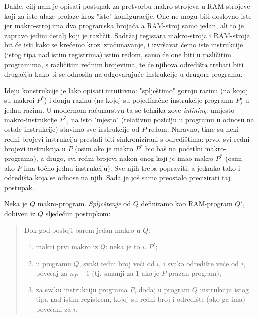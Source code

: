 Dakle, cilj nam je opisati postupak za pretvorbu makro-strojeva u RAM-strojeve koji za iste ulaze prolaze kroz "iste" konfiguracije. One ne mogu biti doslovno iste jer makro-stroj ima dva programska brojača a RAM-stroj samo jedan, ali to je zapravo jedini detalj koji je različit. Sadržaj registara makro-stroja i RAM-stroja bit će isti kako se krećemo kroz izračunavanje, i izvršavat ćemo iste instrukcije (istog tipa nad istim registrima) istim redom, samo će one biti u različitim programima, s različitim rednim brojevima, te će njihova odredišta trebati biti drugačija kako bi se odnosila na odgovarajuće instrukcije u drugom programu.

Ideju konstrukcije je lako opisati intuitivno: "spljoštimo" gornju razinu (na kojoj su makroi $P^*$) i donju razinu (na kojoj su pojedinačne instrukcije programa $P$) u jednu razinu. U modernom računarstvu ta se tehnika zove \emph{inlining}: umjesto makro-instrukcije $P^*$\!, na isto "mjesto" (relativnu poziciju u programu u odnosu na ostale instrukcije) stavimo sve instrukcije od $P$ redom. Naravno, time su neki redni brojevi instrukcija prestali biti sinkronizirani s odredištima: prvo, svi redni brojevi instrukcija u $P$ (osim ako je makro $P^*$ bio baš na početku makro-programa), a drugo, svi redni brojevi nakon onog koji je imao makro $P^*$ (osim ako $P$ ima točno jednu instrukciju). Sve njih treba popraviti, a jednako tako i odredišta koja se odnose na njih. Sada je još samo preostalo precizirati taj postupak.

\begin{definicija}[{name=[spljoštenje]}]\label{def:flat}
Neka je $Q$ makro-program. \emph{Spljoštenje} od $Q$ definiramo kao RAM-program $Q^\flat$, dobiven iz $Q$ sljedećim postupkom:
\begin{quotation}
Dok god postoji barem jedan makro u $Q$:
\begin{enumerate}
    \item\label{korak:makni} makni prvi makro iz $Q$: neka je to $i.\;P^*$;
    \item\label{korak:renumeriraj} u programu $Q$, svaki redni broj veći od $i$, i svako odredište veće od $i$, povećaj za $n_P-1$ (tj.\ smanji za $1$ ako je $P$ prazan program);
    \item\label{korak:dodaj} za svaku instrukciju programa $P$, dodaj u program $Q$ instrukciju istog tipa nad istim registrom, kojoj su redni broj i odredište (ako ga ima) povećani za $i$.\qedhere
\end{enumerate}
\end{quotation}
\end{definicija}

